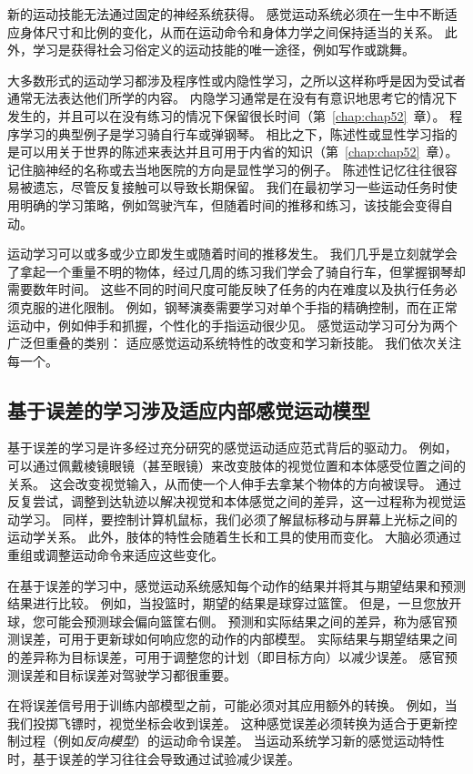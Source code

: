 新的运动技能无法通过固定的神经系统获得。
感觉运动系统必须在一生中不断适应身体尺寸和比例的变化，从而在运动命令和身体力学之间保持适当的关系。
此外，学习是获得社会习俗定义的运动技能的唯一途径，例如写作或跳舞。


大多数形式的运动学习都涉及程序性或内隐性学习，之所以这样称呼是因为受试者通常无法表达他们所学的内容。
内隐学习通常是在没有有意识地思考它的情况下发生的，并且可以在没有练习的情况下保留很长时间（第~\ref{chap:chap52}~章）。
程序学习的典型例子是学习骑自行车或弹钢琴。 相比之下，陈述性或显性学习指的是可以用关于世界的陈述来表达并且可用于内省的知识（第~\ref{chap:chap52}~章）。
记住脑神经的名称或去当地医院的方向是显性学习的例子。
陈述性记忆往往很容易被遗忘，尽管反复接触可以导致长期保留。
我们在最初学习一些运动任务时使用明确的学习策略，例如驾驶汽车，但随着时间的推移和练习，该技能会变得自动。


运动学习可以或多或少立即发生或随着时间的推移发生。
我们几乎是立刻就学会了拿起一个重量不明的物体，经过几周的练习我们学会了骑自行车，但掌握钢琴却需要数年时间。
这些不同的时间尺度可能反映了任务的内在难度以及执行任务必须克服的进化限制。
例如，钢琴演奏需要学习对单个手指的精确控制，而在正常运动中，例如伸手和抓握，个性化的手指运动很少见。
感觉运动学习可分为两个广泛但重叠的类别：
适应感觉运动系统特性的改变和学习新技能。
我们依次关注每一个。



\subsection{基于误差的学习涉及适应内部感觉运动模型}

基于误差的学习是许多经过充分研究的感觉运动适应范式背后的驱动力。
例如，可以通过佩戴棱镜眼镜（甚至眼镜）来改变肢体的视觉位置和本体感受位置之间的关系。
这会改变视觉输入，从而使一个人伸手去拿某个物体的方向被误导。
通过反复尝试，调整到达轨迹以解决视觉和本体感觉之间的差异，这一过程称为视觉运动学习。
同样，要控制计算机鼠标，我们必须了解鼠标移动与屏幕上光标之间的运动学关系。
此外，肢体的特性会随着生长和工具的使用而变化。
大脑必须通过重组或调整运动命令来适应这些变化。


在基于误差的学习中，感觉运动系统感知每个动作的结果并将其与期望结果和预测结果进行比较。
例如，当投篮时，期望的结果是球穿过篮筐。
但是，一旦您放开球，您可能会预测球会偏向篮筐右侧。
预测和实际结果之间的差异，称为感官预测误差，可用于更新球如何响应您的动作的内部模型。
实际结果与期望结果之间的差异称为目标误差，可用于调整您的计划（即目标方向）以减少误差。
感官预测误差和目标误差对驾驶学习都很重要。


在将误差信号用于训练内部模型之前，可能必须对其应用额外的转换。
例如，当我们投掷飞镖时，视觉坐标会收到误差。
这种感觉误差必须转换为适合于更新控制过程（例如\textit{反向模型}）的运动命令误差。
当运动系统学习新的感觉运动特性时，基于误差的学习往往会导致通过试验减少误差。


